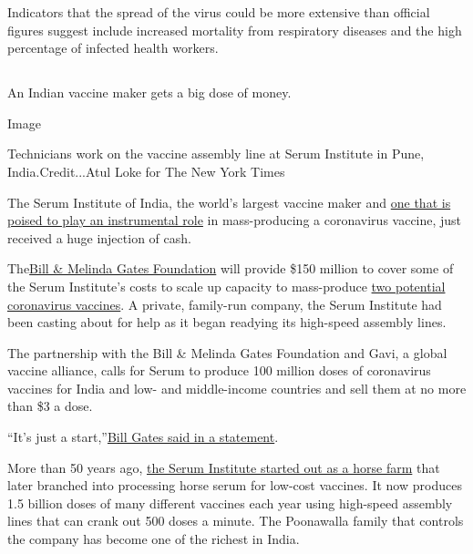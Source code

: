 Indicators that the spread of the virus could be more extensive than
official figures suggest include increased mortality from respiratory
diseases and the high percentage of infected health workers.

\hypertarget{section-5}{%
\subsection{}\label{section-5}}

An Indian vaccine maker gets a big dose of money.

Image

Technicians work on the vaccine assembly line at Serum Institute in
Pune, India.Credit...Atul Loke for The New York Times

The Serum Institute of India, the world's largest vaccine maker and
\href{https://www.nytimes3xbfgragh.onion/2020/08/01/world/asia/coronavirus-vaccine-india.html}{one
that is poised to play an instrumental role} in mass-producing a
coronavirus vaccine, just received a huge injection of cash.

The\href{https://www.gatesfoundation.org/}{Bill \& Melinda Gates
Foundation} will provide \$150 million to cover some of the Serum
Institute's costs to scale up capacity to mass-produce
\href{https://www.nytimes3xbfgragh.onion/interactive/2020/science/coronavirus-vaccine-tracker.html?action=click\&module=RelatedLinks\&pgtype=Article}{two
potential coronavirus vaccines}. A private, family-run company, the
Serum Institute had been casting about for help as it began readying its
high-speed assembly lines.

The partnership with the Bill \& Melinda Gates Foundation and Gavi, a
global vaccine alliance, calls for Serum to produce 100 million doses of
coronavirus vaccines for India and low- and middle-income countries and
sell them at no more than \$3 a dose.

``It's just a
start,''\href{https://www.gavi.org/news/media-room/100-million-covid-19-vaccine-doses-available-low-and-middle-income-countries-2021}{Bill
Gates said in a statement}.

More than 50 years ago,
\href{https://www.nytimes3xbfgragh.onion/2020/08/01/world/asia/coronavirus-vaccine-india.html}{the
Serum Institute started out as a horse farm} that later branched into
processing horse serum for low-cost vaccines. It now produces 1.5
billion doses of many different vaccines each year using high-speed
assembly lines that can crank out 500 doses a minute. The Poonawalla
family that controls the company has become one of the richest in India.

